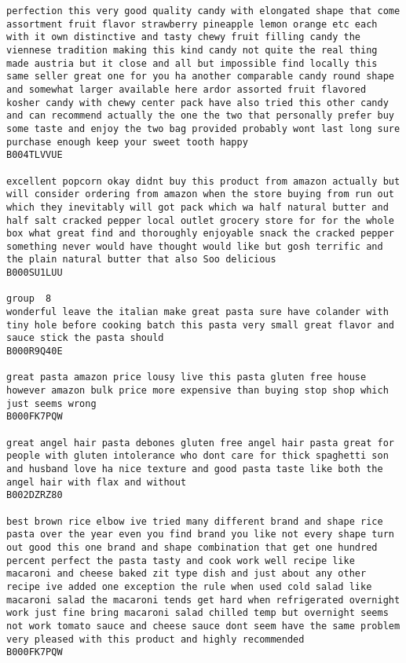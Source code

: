 \documentclass[11pt]{article}
\begin{document}
\begin{Verbatim}[commandchars=\\\{\}]
perfection this very good quality candy with elongated shape that come assortment fruit flavor strawberry pineapple lemon orange etc each with it own distinctive and tasty chewy fruit filling candy the viennese tradition making this kind candy not quite the real thing made austria but it close and all but impossible find locally this same seller great one for you ha another comparable candy round shape and somewhat larger available here ardor assorted fruit flavored kosher candy with chewy center pack have also tried this other candy and can recommend actually the one the two that personally prefer buy some taste and enjoy the two bag provided probably wont last long sure purchase enough keep your sweet tooth happy
B004TLVVUE

excellent popcorn okay didnt buy this product from amazon actually but will consider ordering from amazon when the store buying from run out which they inevitably will got pack which wa half natural butter and half salt cracked pepper local outlet grocery store for for the whole box what great find and thoroughly enjoyable snack the cracked pepper something never would have thought would like but gosh terrific and the plain natural butter that also Soo delicious
B000SU1LUU

group  8
wonderful leave the italian make great pasta sure have colander with tiny hole before cooking batch this pasta very small great flavor and sauce stick the pasta should
B000R9Q40E

great pasta amazon price lousy live this pasta gluten free house however amazon bulk price more expensive than buying stop shop which just seems wrong
B000FK7PQW

great angel hair pasta debones gluten free angel hair pasta great for people with gluten intolerance who dont care for thick spaghetti son and husband love ha nice texture and good pasta taste like both the angel hair with flax and without
B002DZRZ80

best brown rice elbow ive tried many different brand and shape rice pasta over the year even you find brand you like not every shape turn out good this one brand and shape combination that get one hundred percent perfect the pasta tasty and cook work well recipe like macaroni and cheese baked zit type dish and just about any other recipe ive added one exception the rule when used cold salad like macaroni salad the macaroni tends get hard when refrigerated overnight work just fine bring macaroni salad chilled temp but overnight seems not work tomato sauce and cheese sauce dont seem have the same problem very pleased with this product and highly recommended
B000FK7PQW


\end{Verbatim}
\end{document}
